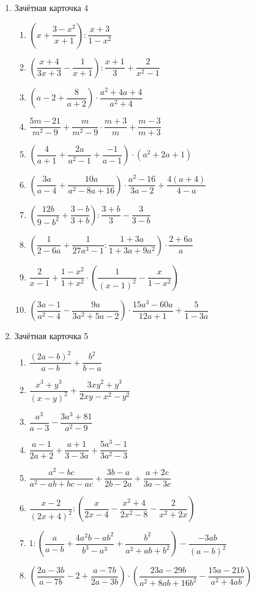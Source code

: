 \documentclass[12pt, a4paper]{article}
\begin{document}
\begin{enumerate}
\begin{enumerate}[label=\asbuk*)]
	\end{enumerate}
	\item Зачётная карточка 4
	\begin{enumerate}[label=\asbuk*)]
		\item \( \left( x+\dfrac{3-x^2}{x+1} \right):\dfrac{x+3}{1-x^2} \)
		\item \( \left( \dfrac{x+4}{3x+3}-\dfrac{1}{x+1} \right):\dfrac{x+1}{3}+\dfrac{2}{x^2-1} \)
		\item \( \left( a-2+\dfrac{8}{a+2} \right) \cdot\dfrac{a^2+4a+4}{a^2+4}\)
		\item \( \dfrac{5m-21}{m^2-9}+\dfrac{m}{m^2-9}\cdot\dfrac{m+3}{m}+\dfrac{m-3}{m+3} \)
		\item \( \left( \dfrac{4}{a+1}+\dfrac{2a}{a^2-1}+\dfrac{-1}{a-1} \right)\cdot(a^2+2a+1) \)
		\item \( \left( \dfrac{3a}{a-4}+\dfrac{10a}{a^2-8a+16} \right) \cdot\dfrac{a^2-16}{3a-2}+\dfrac{4(a+4)}{4-a}\)
		\item \( \left( \dfrac{12b}{9-b^2}+\dfrac{3-b}{3+b} \right):\dfrac{3+b}{3}-\dfrac{3}{3-b} \)
		\item \( \left( \dfrac{1}{2-6a}+\dfrac{1}{27a^3-1}:\dfrac{1+3a}{1+3a+9a^2} \right)\cdot\dfrac{2+6a}{a} \)
		\item \( \dfrac{2}{x-1}+\dfrac{1-x^2}{1+x^2}\cdot\left( \dfrac{1}{(x-1)^2}-\dfrac{x}{1-x^2} \right) \)
		\item \( \left( \dfrac{3a-1}{a^2-4}-\dfrac{9a}{3a^2+5a-2} \right)\cdot\dfrac{15a^3-60a}{12a+1}+\dfrac{5}{1-3a} \)
	\end{enumerate}
	\item Зачётная карточка 5
	\begin{enumerate}[label=\asbuk*)]
		\item \( \dfrac{(2a-b)^2}{a-b}+\dfrac{b^2}{b-a} \)
		\item \( \dfrac{x^3+y^3}{(x-y)^2}+\dfrac{3xy^2+y^3}{2xy-x^2-y^2} \)
		\item \( \dfrac{a^3}{a-3}-\dfrac{3a^3+81}{a^2-9} \)
		\item \( \dfrac{a-1}{2a+2}+\dfrac{a+1}{3-3a}+\dfrac{5a^3-1}{3a^2-3} \)
		\item \( \dfrac{a^2-bc}{a^2-ab+bc-ac}+\dfrac{3b-a}{2b-2a}+\dfrac{a+2c}{3a-3c} \)
		\item \( \dfrac{x-2}{(2x+4)^2}:\left( \dfrac{x}{2x-4}-\dfrac{x^2+4}{2x^2-8}-\dfrac{2}{x^2+2x} \right) \)
		\item \( 1:\left( \dfrac{a}{a-b}+\dfrac{4a^2b-ab^2}{b^3-a^3}+\dfrac{b^2}{a^2+ab+b^2} \right) -\dfrac{-3ab}{(a-b)^2}\)
		\item \( \left( \dfrac{2a-3b}{a-7b}-2+\dfrac{a-7b}{2a-3b} \right)\cdot\left( \dfrac{23a-29b}{a^2+8ab+16b^2}-\dfrac{15a-21b}{a^2+4ab} \right) \)

\end{enumerate}
\end{enumerate}
\end{document}
